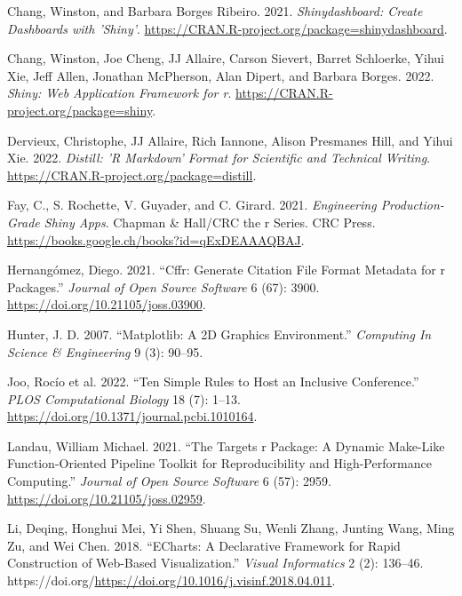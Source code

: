 \documentclass[
  12pt,
  letterpaper,
]{krantz}
\newlength{\cslhangindent}
\newlength{\cslentryspacingunit} %
\newenvironment{CSLReferences}[2] %
 {%
  \setlength{\parindent}{0pt}
  \ifodd #1
  \let\oldpar\par
  \def\par{\hangindent=\cslhangindent\oldpar}
  \fi
  \setlength{\parskip}{#2\cslentryspacingunit}
 }%
 {}
\begin{document}
\begin{CSLReferences}{1}{0}
\leavevmode{}%
Chang, Winston, and Barbara Borges Ribeiro. 2021. \emph{Shinydashboard:
Create Dashboards with 'Shiny'}.
\url{https://CRAN.R-project.org/package=shinydashboard}.

\leavevmode{}%
Chang, Winston, Joe Cheng, JJ Allaire, Carson Sievert, Barret Schloerke,
Yihui Xie, Jeff Allen, Jonathan McPherson, Alan Dipert, and Barbara
Borges. 2022. \emph{Shiny: Web Application Framework for r}.
\url{https://CRAN.R-project.org/package=shiny}.

\leavevmode{}%
Dervieux, Christophe, JJ Allaire, Rich Iannone, Alison Presmanes Hill,
and Yihui Xie. 2022. \emph{Distill: 'R Markdown' Format for Scientific
and Technical Writing}.
\url{https://CRAN.R-project.org/package=distill}.

\leavevmode{}%
Fay, C., S. Rochette, V. Guyader, and C. Girard. 2021. \emph{Engineering
Production-Grade Shiny Apps}. Chapman \& Hall/CRC the r Series. CRC
Press. \url{https://books.google.ch/books?id=qExDEAAAQBAJ}.

\leavevmode{}%
Hernangómez, Diego. 2021. {``Cffr: Generate Citation File Format
Metadata for r Packages.''} \emph{Journal of Open Source Software} 6
(67): 3900. \url{https://doi.org/10.21105/joss.03900}.

\leavevmode{}%
Hunter, J. D. 2007. {``Matplotlib: A 2D Graphics Environment.''}
\emph{Computing In Science \& Engineering} 9 (3): 90--95.

\leavevmode{}%
Joo, Rocío et al. 2022. {``Ten Simple Rules to Host an Inclusive
Conference.''} \emph{PLOS Computational Biology} 18 (7): 1--13.
\url{https://doi.org/10.1371/journal.pcbi.1010164}.

\leavevmode{}%
Landau, William Michael. 2021. {``The Targets r Package: A Dynamic
Make-Like Function-Oriented Pipeline Toolkit for Reproducibility and
High-Performance Computing.''} \emph{Journal of Open Source Software} 6
(57): 2959. \url{https://doi.org/10.21105/joss.02959}.

\leavevmode{}%
Li, Deqing, Honghui Mei, Yi Shen, Shuang Su, Wenli Zhang, Junting Wang,
Ming Zu, and Wei Chen. 2018. {``ECharts: A Declarative Framework for
Rapid Construction of Web-Based Visualization.''} \emph{Visual
Informatics} 2 (2): 136--46.
https://doi.org/\url{https://doi.org/10.1016/j.visinf.2018.04.011}.


\end{CSLReferences}
\end{document}
